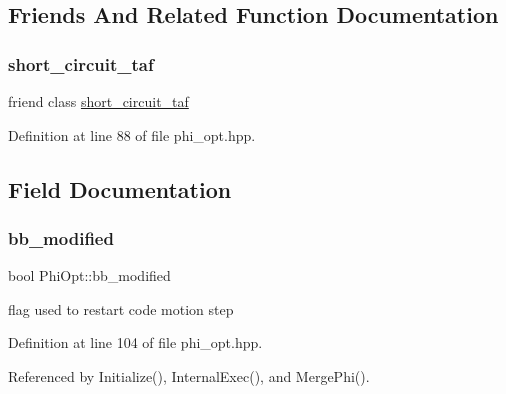 \subsection{Friends And Related Function Documentation}
\mbox{\label{classPhiOpt_abefe683fd46c528422c3d2bf0fc546d4}} 
\subsubsection{\texorpdfstring{short\+\_\+circuit\+\_\+taf}{short\_circuit\_taf}}
{\footnotesize\ttfamily friend class \hyperlink{classshort__circuit__taf}{short\+\_\+circuit\+\_\+taf}\hspace{0.3cm}{\ttfamily [friend]}}



Definition at line 88 of file phi\+\_\+opt.\+hpp.



\subsection{Field Documentation}
\mbox{\label{classPhiOpt_a6c89ff366752e9be3bf875cc93ef60d3}} 
\subsubsection{\texorpdfstring{bb\+\_\+modified}{bb\_modified}}
{\footnotesize\ttfamily bool Phi\+Opt\+::bb\+\_\+modified\hspace{0.3cm}{\ttfamily [private]}}



flag used to restart code motion step 



Definition at line 104 of file phi\+\_\+opt.\+hpp.



Referenced by Initialize(), Internal\+Exec(), and Merge\+Phi().

\mbox{\label{classPhiOpt_a4cbcc0b8ed5df57d64d71cd9a957a55a}} 
